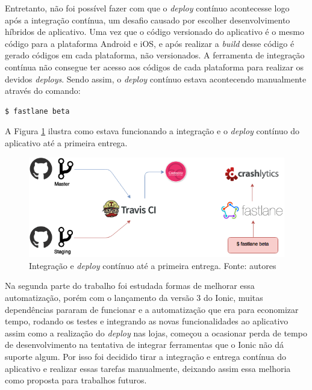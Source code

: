 Entretanto, não foi possível fazer com que o \textit{deploy} contínuo acontecesse logo após a integração contínua, um desafio causado por escolher desenvolvimento híbridos de aplicativo. Uma vez que o código versionado do aplicativo é o mesmo código para a plataforma Android e iOS, e após realizar a \textit{build} desse código é gerado códigos em cada plataforma, não versionados. A ferramenta de integração contínua não consegue ter acesso aos códigos de cada plataforma para realizar os devidos \textit{deploys}. Sendo assim, o \textit{deploy} contínuo estava acontecendo manualmente através do comando:

\begin{lstlisting}[language=bash]
  $ fastlane beta
\end{lstlisting}

A Figura \ref{img:integracao_deploy_continuo_atual} ilustra como estava funcionando a integração e o \textit{deploy} contínuo do aplicativo até a primeira entrega.

\begin{figure}[H]
    \centering
    \includegraphics[scale=0.5]{figuras/ci_currently.png}
    \caption[Integração e \textit{deploy} contínuo atual]{Integração e \textit{deploy} contínuo até a primeira entrega. Fonte: autores}
    \label{img:integracao_deploy_continuo_atual}
\end{figure}

Na segunda parte do trabalho foi estudada formas de melhorar essa automatização, porém com o lançamento da versão 3 do Ionic, muitas dependências pararam de funcionar e a automatização que era para economizar tempo, rodando os testes e integrando as novas funcionalidades ao aplicativo assim como a realização do \textit{deploy} nas lojas, começou a ocasionar perda de tempo de desenvolvimento na tentativa de integrar ferramentas que o Ionic não dá suporte algum. Por isso foi decidido tirar a integração e entrega contínua do aplicativo e realizar essas tarefas manualmente, deixando assim essa melhoria como proposta para trabalhos futuros.
